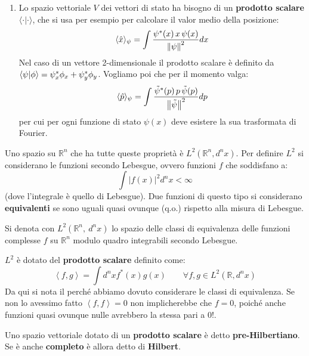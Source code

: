 \documentclass[FisicaTeorica.tex]{subfiles}
\begin{document}
\begin{enumerate}
\begin{dfn}
    \end{dfn}
    \item Lo spazio vettoriale $V$ dei vettori di stato ha bisogno di un \textbf{prodotto scalare} $\langle \cdot | \cdot \rangle$, che si usa per esempio per calcolare il valor medio della posizione:
    \[
    \langle \hat{x}\rangle_\psi = \int \frac{\psi^*(x) \, x \, \psi(x)}{\left\lVert\psi\right\rVert^2} dx
    \]
    Nel caso di un vettore 2-dimensionale il prodotto scalare è definito da $\braket{\psi|\phi} = \psi_x^* \phi_x + \psi_y^* \phi_y$.
    Vogliamo poi che per il momento valga:
    \[
    \langle \hat{p} \rangle_\psi = \int \frac{\tilde\psi^*(p) \, p \, \tilde\psi(p)}{\left\lVert\tilde{\psi}\right\rVert^2} dp
    \]
    per cui per ogni funzione di stato  $\psi(x)$ deve esistere la sua trasformata di Fourier.
\end{enumerate}
Uno spazio su $\mathbb{R}^n$ che ha tutte queste proprietà è $L^2\left(\mathbb{R}^n,d^nx\right)$. Per definire $L^2$ si  considerano le funzioni  secondo Lebesgue, ovvero funzioni $f$ che soddisfano a:
\[
	\int \left|f\left(x\right)\right|^2d^nx<\infty
\]
(dove l'integrale è quello di Lebesgue). Due funzioni di questo tipo si considerano \textbf{equivalenti} se sono uguali quasi ovunque (q.o.) rispetto alla misura di Lebesgue.
\begin{dfn}
Si denota con $L^2\left(\mathbb{R}^n,\ d^n x\right)$ lo spazio delle classi di equivalenza delle funzioni complesse $f$ su $\mathbb{R}^n$ modulo quadro integrabili secondo Lebesgue.
\end{dfn}
$L^2$ è dotato del \textbf{prodotto scalare} definito come:
\[
	\left\langle f,g\right\rangle=\int d^n x f^*\left(x\right)g\left(x\right) \qquad \forall f,g \in L^2\left(\mathbb{R},d^n x\right)
\]
Da qui si nota il perché abbiamo dovuto considerare le classi di equivalenza. Se non lo avessimo fatto $\left\langle f,f\right\rangle=0$ non implicherebbe che $f=0$, poiché anche funzioni quasi ovunque nulle avrebbero la stessa  pari a $0$!.
\begin{dfn}
Uno spazio vettoriale dotato di un \textbf{prodotto scalare} è detto \textbf{pre-Hilbertiano}. Se è anche \textbf{completo} è allora detto di \textbf{Hilbert}.
\end{dfn}
\end{document}
